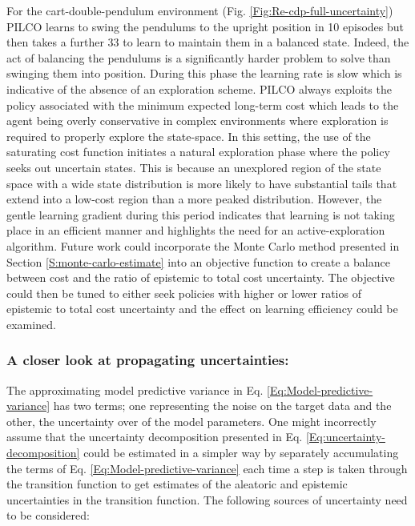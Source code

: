For the cart-double-pendulum environment (Fig. \ref{Fig:Re-cdp-full-uncertainty}) PILCO learns to swing the pendulums to the upright position in 10 episodes but then takes a further 33 to learn to maintain them in a balanced state. Indeed, the act of balancing the pendulums is a significantly harder problem to solve than swinging them into position. During this phase the learning rate is slow which is indicative of the absence of an exploration scheme. PILCO always exploits the policy associated with the minimum expected long-term cost which leads to the agent being overly conservative in complex environments where exploration is required to properly explore the state-space. In this setting, the use of the saturating cost function initiates a natural exploration phase where the policy seeks out uncertain states. This is because an unexplored region of the state space with a wide state distribution is more likely to have substantial tails that extend into a low-cost region than a more peaked distribution. However, the gentle learning gradient during this period indicates that learning is not taking place in an efficient manner and highlights the need for an active-exploration algorithm. Future work could incorporate the Monte Carlo method presented in Section \ref{S:monte-carlo-estimate} into an objective function to create a balance between cost and the ratio of epistemic to total cost uncertainty. The objective could then be tuned to either seek policies with higher or lower ratios of epistemic to total cost uncertainty and the effect on learning efficiency could be examined.

\subsubsection{A closer look at propagating uncertainties:}
The approximating model predictive variance in Eq. \ref{Eq:Model-predictive-variance} has two terms; one representing the noise on the target data and the other, the uncertainty over of the model parameters. One might incorrectly assume that the uncertainty decomposition presented in Eq. \ref{Eq:uncertainty-decomposition} could be estimated in a simpler way by separately accumulating the terms of Eq. \ref{Eq:Model-predictive-variance} each time a step is taken through the transition function to get estimates of the aleatoric and epistemic uncertainties in the transition function. The following sources of uncertainty need to be considered: 

